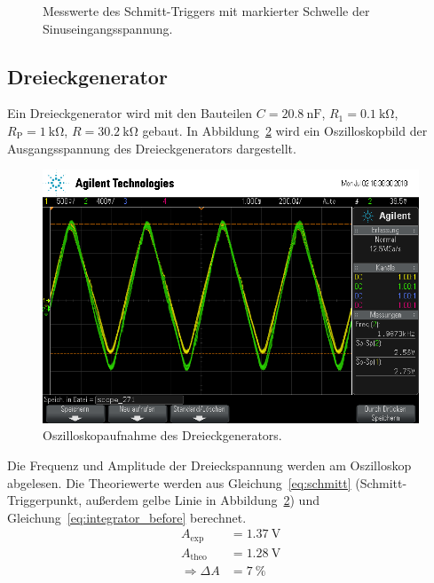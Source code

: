 \begin{figure}[ht]
  \centering
    \centering
    
    \caption{Messwerte des Schmitt-Triggers mit markierter Schwelle der Sinuseingangsspannung.}
    \label{fig:schmitt_plot}
  \label{fig:schmitt}
\end{figure}

\subsection{Dreieckgenerator}
Ein Dreieckgenerator wird mit den Bauteilen
$C = \SI{20.8}{\nano\farad}$,
$R_1 = \SI{0.1}{\kilo\ohm}$,
$R_\text{P} = \SI{1}{\kilo\ohm}$,
$R = \SI{30.2}{\kilo\ohm}$
gebaut.
In Abbildung~\ref{fig:dreieck_generator} wird ein Oszilloskopbild
der Ausgangsspannung des Dreieckgenerators dargestellt.
\begin{figure}[ht]
  \centering
  \includegraphics[height=0.3\textheight]{data/scope_271.png}
  \caption{Oszilloskopaufnahme des Dreieckgenerators.}
  \label{fig:dreieck_generator}
\end{figure}

Die Frequenz und Amplitude der Dreieckspannung werden am Oszilloskop abgelesen.
Die Theoriewerte werden aus Gleichung~\eqref{eq:schmitt} (Schmitt-Triggerpunkt, außerdem gelbe Linie in Abbildung~\ref{fig:dreieck_generator})
und Gleichung~\eqref{eq:integrator_before} berechnet.
\begin{align*}
  A_\text{exp} &= \SI{1.37}{\volt} \\
  A_\text{theo} &= \SI{1.28}{\volt} \\
  \Rightarrow \Delta A &= \SI{7}{\percent}
\end{align*}

